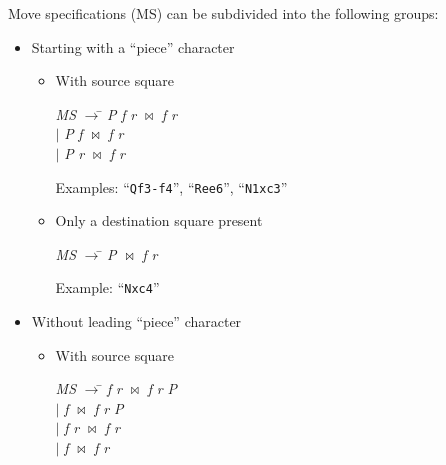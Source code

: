 \documentclass[a4paper]{article}
\def\abbrev#1{\textsf{#1}}
\def\bnf#1{\textit{#1}}
\def\bnfprod{$\rightarrow$}
\def\bnfor{$|$}
\def\bnfjoin{$\bowtie$}
\begin{document}
Move specifications (\abbrev{MS}) can be subdivided into the following groups:

\begin{itemize}
\item Starting with a ``piece'' character

\begin{itemize}
\item With source square
\begin{center}
\begin{minipage}{3cm}
\begin{tabbing}
\bnf{MS} \bnfprod\={} \bnf{P} \bnf{f} \bnf{r} \bnfjoin{} \bnf{f} \bnf{r}\\
 \>\bnfor{} \bnf{P} \bnf{f} \bnfjoin{} \bnf{f} \bnf{r}\\
 \>\bnfor{} \bnf{P} \bnf{r} \bnfjoin{} \bnf{f} \bnf{r}
\end{tabbing}
\end{minipage}
\end{center}

Examples: ``\texttt{Qf3-f4}'', ``\texttt{Ree6}'', ``\texttt{N1xc3}''
\item Only a destination square present

\begin{center}
\begin{minipage}{3cm}
\begin{tabbing}
\bnf{MS} \bnfprod\={} \bnf{P} \bnfjoin{} \bnf{f} \bnf{r}
\end{tabbing}
\end{minipage}
\end{center}

Example: ``\texttt{Nxc4}''
\end{itemize}

\item Without leading ``piece'' character

\begin{itemize}
\item With source square

\begin{center}
\begin{minipage}{3cm}
\begin{tabbing}
\bnf{MS} \bnfprod\={} \bnf{f} \bnf{r} \bnfjoin{} \bnf{f} \bnf{r} \bnf{P}\\
 \>\bnfor{} \bnf{f} \bnfjoin{} \bnf{f} \bnf{r} \bnf{P}\\
 \>\bnfor{} \bnf{f} \bnf{r} \bnfjoin{} \bnf{f} \bnf{r}\\
 \>\bnfor{} \bnf{f} \bnfjoin{} \bnf{f} \bnf{r}
\end{tabbing}
\end{minipage}
\end{center}


\end{itemize}
\end{itemize}
\end{document}

